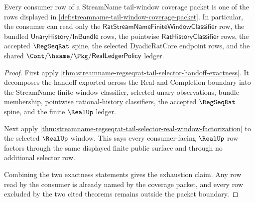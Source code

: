 \begin{theorem}
\label{thm:streamname-tail-window-coverage-exhaustion}
Every consumer row of a StreamName tail-window coverage packet is one of the
rows displayed in \autoref{def:streamname-tail-window-coverage-packet}. In
particular, the consumer can read only the
$\mathsf{RatStreamNameFiniteWindowClassifier}$ row, the bundled
$\mathsf{UnaryHistory}/\mathsf{InBundle}$ rows, the pointwise
$\mathsf{RatHistoryClassifier}$ rows, the accepted $\RegSeqRat$ spine, the
selected DyadicRatCore endpoint rows, and the shared
$\Cont/\hsame/\Pkg/\mathsf{RealLedgerPolicy}$ ledger.
\end{theorem}
\begin{proof}
First apply
\autoref{thm:streamname-regseqrat-tail-selector-handoff-exactness}. It
decomposes the handoff exported across the Real-and-Completion boundary into
the StreamName finite-window classifier, selected unary observations, bundle
membership, pointwise rational-history classifiers, the accepted $\RegSeqRat$
spine, and the finite $\RealUp$ ledger.

Next apply
\autoref{thm:streamname-regseqrat-tail-selector-real-window-factorization} to
the selected $\RealUp$ window. This says every consumer-facing $\RealUp$ row
factors through the same displayed finite public surface and through no
additional selector row.

Combining the two exactness statements gives the exhaustion claim. Any row
read by the consumer is already named by the coverage packet, and every row
excluded by the two cited theorems remains outside the packet boundary.
\end{proof}

